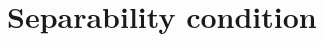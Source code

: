 \documentclass[]{elsarticle}
\theoremstyle{definition}
\begin{document}
%


\appendix
\section{Separability condition}\label{sepcondition}
\end{document}
